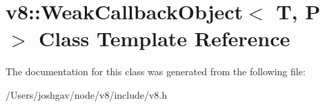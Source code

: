 \hypertarget{classv8_1_1_weak_callback_object}{}\section{v8\+:\+:Weak\+Callback\+Object$<$ T, P $>$ Class Template Reference}
\label{classv8_1_1_weak_callback_object}


The documentation for this class was generated from the following file\+:\begin{DoxyCompactItemize}
\item 
/\+Users/joshgav/node/v8/include/v8.\+h\end{DoxyCompactItemize}
